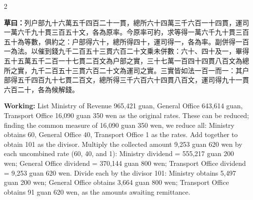 \documentclass[11pt,a4paper]{article}
\newcommand{\WorkingText}[1]{\par\noindent\textbf{草曰：}#1\par}
\newcommand{\WorkingEn}[1]{\par\noindent\textbf{Working:} #1\par}
\begin{document}
\begin{paracol}{2}
\WorkingText{列户部九十六萬五千四百二十一貫，總所六十四萬三千六百一十四貫，運司一萬六千九十貫三百五十文，各為原率。今原率可約，求等得一萬六千九十貫三百五十為等數，俱約之：户部得六十，總所得四十，運司得一，各為率。副併得一百一為法。以催到錢九千二百五十三貫六百二十文乗未併數：六十、四十及一，畢得五十五萬五千二百一十七貫二百文為户部之實，三十七萬一百四十四貫八百文為總所之實，九千二百五十三貫六百二十文為運司之實。三實皆如法一百一而一：其户部得五千四百九十七貫二百文，總所得三千六百六十四貫八百文，運司得九十一貫六百二十，各為候解錢。}
\switchcolumn
\WorkingEn{List Ministry of Revenue 965,421 guan, General Office 643,614 guan, Transport Office 16,090 guan 350 wen as the original rates. These can be reduced; finding the common measure of 16,090 guan 350 wen, we reduce all: Ministry obtains 60, General Office 40, Transport Office 1 as the rates. Add together to obtain 101 as the divisor. Multiply the collected amount 9,253 guan 620 wen by each uncombined rate (60, 40, and 1): Ministry dividend = 555,217 guan 200 wen; General Office dividend = 370,144 guan 800 wen; Transport Office dividend = 9,253 guan 620 wen. Divide each by the divisor 101: Ministry obtains 5,497 guan 200 wen; General Office obtains 3,664 guan 800 wen; Transport Office obtains 91 guan 620 wen, as the amounts awaiting remittance.}

\end{paracol}
\end{document}
